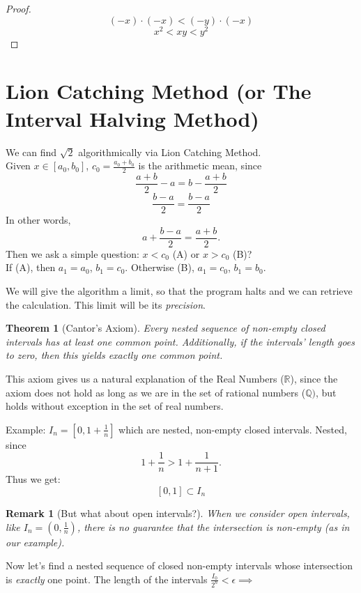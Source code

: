 \documentclass{article}
\newtheorem{theorem}{Theorem}
\newtheorem*{remark}{Remark}
\begin{document}
\begin{proof}
    \[
    (-x) \cdot (-x) < (-y) \cdot (-x)
    \]
    \[
    x^2 < xy < y^2
    \]
\end{proof}

\section{Lion Catching Method (or The Interval Halving Method)}
We can find $\sqrt{2}$ algorithmically via Lion Catching Method.\\
Given $x \in [a_0, b_0]$, $c_0 = \frac{a_0 + b_0}{2}$ is the arithmetic mean, since
\[
    \frac{a + b}{2} - a = b - \frac{a+b}{2}
\]
\[
    \frac{b-a}{2} = \frac{b-a}{2}
\]
In other words,
\[
    a + \frac{b-a}{2} = \frac{a+b}{2}.
\]
Then we ask a simple question: $x < c_0$ (A) or $x > c_0$ (B)?\\
If (A), then $a_1 = a_0$, $b_1 = c_0$. Otherwise (B), $a_1 = c_0$, $b_1 = b_0$.

We will give the algorithm a limit, so that the program halts and we can retrieve the calculation. This limit will be its \emph{precision}.

\begin{theorem}[Cantor's Axiom]
    Every nested sequence of non-empty closed intervals has at least one common point. Additionally, if the intervals' length goes to zero, then this yields \emph{exactly} one common point.
\end{theorem}
This axiom gives us a natural explanation of the Real Numbers ($\mathbb{R}$), since the axiom does not hold as long as we are in the set of rational numbers ($\mathbb{Q})$, but holds without exception in the set of real numbers.

Example: $I_n = [0, 1 + \frac{1}{n}]$ which are nested, non-empty closed intervals. Nested, since
\[
    1 + \frac{1}{n} > 1 + \frac{1}{n+1}.
\]
Thus we get:
\[
    [0, 1] \subset I_n
\]

\begin{remark}[But what about open intervals?]
When we consider open intervals, like $I_n = (0, \frac{1}{n})$, there is no guarantee that the intersection is non-empty (as in our example).
\end{remark}

Now let's find a nested sequence of closed non-empty intervals whose intersection is \emph{exactly} one point.
The length of the intervals $\frac{I_0}{2^n} < \epsilon \implies $ 
\end{document}
